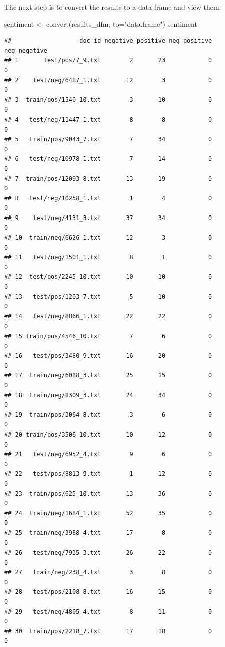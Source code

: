 \documentclass[
]{article}
\newenvironment{Shaded}{\begin{snugshade}}{\end{snugshade}}
\newcommand{\AttributeTok}[1]{\textcolor[rgb]{0.77,0.63,0.00}{#1}}
\newcommand{\FunctionTok}[1]{\textcolor[rgb]{0.00,0.00,0.00}{#1}}
\newcommand{\NormalTok}[1]{#1}
\newcommand{\OtherTok}[1]{\textcolor[rgb]{0.56,0.35,0.01}{#1}}
\newcommand{\StringTok}[1]{\textcolor[rgb]{0.31,0.60,0.02}{#1}}
\begin{document}
The next step is to convert the results to a data frame and view them:

\begin{Shaded}
\begin{Highlighting}[]
\NormalTok{sentiment }\OtherTok{\textless{}{-}} \FunctionTok{convert}\NormalTok{(results\_dfm, }\AttributeTok{to=}\StringTok{"data.frame"}\NormalTok{)}
\NormalTok{sentiment}
\end{Highlighting}
\end{Shaded}

\begin{verbatim}
##                   doc_id negative positive neg_positive neg_negative
## 1       test/pos/7_9.txt        2       23            0            0
## 2    test/neg/6487_1.txt       12        3            0            0
## 3  train/pos/1540_10.txt        3       10            0            0
## 4   test/neg/11447_1.txt        8        8            0            0
## 5   train/pos/9043_7.txt        7       34            0            0
## 6   test/neg/10978_1.txt        7       14            0            0
## 7  train/pos/12093_8.txt       13       19            0            0
## 8   test/neg/10258_1.txt        1        4            0            0
## 9    test/neg/4131_3.txt       37       34            0            0
## 10  train/neg/6626_1.txt       12        3            0            0
## 11   test/neg/1501_1.txt        8        1            0            0
## 12  test/pos/2245_10.txt       10       10            0            0
## 13   test/pos/1203_7.txt        5       10            0            0
## 14   test/neg/8866_1.txt       22       22            0            0
## 15 train/pos/4546_10.txt        7        6            0            0
## 16   test/pos/3480_9.txt       16       20            0            0
## 17  train/neg/6088_3.txt       25       15            0            0
## 18  train/neg/8309_3.txt       24       34            0            0
## 19  train/pos/3064_8.txt        3        6            0            0
## 20 train/pos/3506_10.txt       10       12            0            0
## 21   test/neg/6952_4.txt        9        6            0            0
## 22   test/pos/8813_9.txt        1       12            0            0
## 23  train/pos/625_10.txt       13       36            0            0
## 24  train/neg/1684_1.txt       52       35            0            0
## 25  train/neg/3988_4.txt       17        8            0            0
## 26   test/neg/7935_3.txt       26       22            0            0
## 27   train/neg/238_4.txt        3        8            0            0
## 28   test/pos/2108_8.txt       16       15            0            0
## 29   test/neg/4805_4.txt        8       11            0            0
## 30  train/pos/2218_7.txt       17       18            0            0
\end{verbatim}
\end{document}
